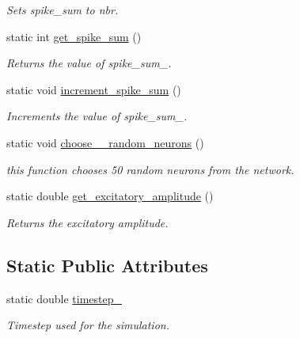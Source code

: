\begin{DoxyCompactItemize}
\begin{DoxyCompactList}\small\item\em Sets spike\+\_\+sum to nbr. \end{DoxyCompactList}\item 
\hypertarget{class_cortex_af4c57d1e1ba16e8b2b3d693173561a4b}{}\label{class_cortex_af4c57d1e1ba16e8b2b3d693173561a4b} 
static int \hyperlink{class_cortex_af4c57d1e1ba16e8b2b3d693173561a4b}{get\+\_\+spike\+\_\+sum} ()
\begin{DoxyCompactList}\small\item\em Returns the value of spike\+\_\+sum\+\_\+. \end{DoxyCompactList}\item 
\hypertarget{class_cortex_af4ecf6c791d1e0d7008fb533be3e6562}{}\label{class_cortex_af4ecf6c791d1e0d7008fb533be3e6562} 
static void \hyperlink{class_cortex_af4ecf6c791d1e0d7008fb533be3e6562}{increment\+\_\+spike\+\_\+sum} ()
\begin{DoxyCompactList}\small\item\em Increments the value of spike\+\_\+sum\+\_\+. \end{DoxyCompactList}\item 
static void \hyperlink{class_cortex_a8b2714cb1ea0bea53dba545e6c1a1633}{choose\+\_\+\_\+random\+\_\+neurons} ()
\begin{DoxyCompactList}\small\item\em this function chooses 50 random neurons from the network. \end{DoxyCompactList}\item 
\hypertarget{class_cortex_a6305ccade8ad3f3984ab3135b4d81e84}{}\label{class_cortex_a6305ccade8ad3f3984ab3135b4d81e84} 
static double \hyperlink{class_cortex_a6305ccade8ad3f3984ab3135b4d81e84}{get\+\_\+excitatory\+\_\+amplitude} ()
\begin{DoxyCompactList}\small\item\em Returns the excitatory amplitude. \end{DoxyCompactList}\end{DoxyCompactItemize}
\subsection*{Static Public Attributes}
\begin{DoxyCompactItemize}
\item 
\hypertarget{class_cortex_a40d3976594c6a2feaf7b140a2b68d265}{}\label{class_cortex_a40d3976594c6a2feaf7b140a2b68d265} 
static double \hyperlink{class_cortex_a40d3976594c6a2feaf7b140a2b68d265}{timestep\+\_\+}
\begin{DoxyCompactList}\small\item\em Timestep used for the simulation. \end{DoxyCompactList}\end{DoxyCompactItemize}



